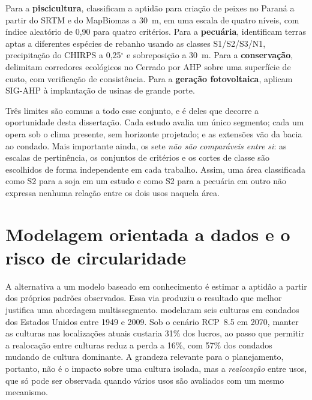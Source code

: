 Para a \textbf{piscicultura}, \citet[pp.~4--5, 7, 9]{francisco_classification_2019} classificam a
aptidão para criação de peixes no Paraná a partir do SRTM e do MapBiomas a 30~m, em uma escala de quatro
níveis, com índice aleatório de 0,90 para quatro critérios. Para a \textbf{pecuária},
\citet[pp.~3--5]{balew_identification_2022} identificam terras aptas a diferentes espécies de rebanho
usando as classes S1/S2/S3/N1, precipitação do CHIRPS a 0,25$^\circ$ e sobreposição a 30~m.
Para a \textbf{conservação}, \citet[pp.~2, 6]{morandi_delimitation_2020} delimitam corredores
ecológicos no Cerrado por AHP sobre uma superfície de custo, com verificação de consistência. Para a
\textbf{geração fotovoltaica}, \citet[pp.~6, 8]{elboshy_suitability_2022} aplicam SIG-AHP à implantação
de usinas de grande porte.

Três limites são comuns a todo esse conjunto, e é deles que decorre a oportunidade desta dissertação.
Cada estudo avalia um único segmento; cada um opera sob o clima presente, sem horizonte projetado; e as
extensões vão da bacia ao condado. Mais importante ainda, os sete \emph{não são comparáveis entre si}:
as escalas de pertinência, os conjuntos de critérios e os cortes de classe são escolhidos de forma
independente em cada trabalho. Assim, uma área classificada como S2 para a soja em um estudo e como S2
para a pecuária em outro não expressa nenhuma relação entre os dois usos naquela área.

\section{Modelagem orientada a dados e o risco de circularidade}\label{sec:sota-ml}

A alternativa a um modelo baseado em conhecimento é estimar a aptidão a partir dos próprios padrões
observados. Essa via produziu o resultado que melhor justifica uma abordagem multissegmento.
\citet[p.~1]{rising_crop_2020} modelaram seis culturas em condados dos Estados Unidos entre 1949 e
2009. Sob o cenário RCP~8.5 em 2070, manter as culturas nas localizações atuais custaria 31\% dos lucros,
ao passo que permitir a realocação entre culturas reduz a perda a 16\%, com 57\% dos condados mudando de
cultura dominante. A grandeza relevante para o planejamento, portanto, não é o impacto sobre uma cultura
isolada, mas a \emph{realocação} entre usos, que só pode ser observada quando vários usos são avaliados
com um mesmo mecanismo.

